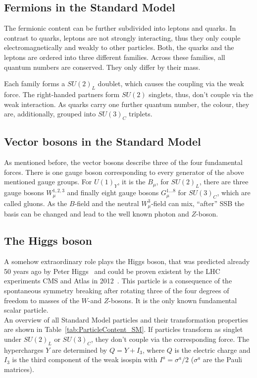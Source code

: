 \subsection*{Fermions in the Standard Model}
The fermionic content can be further subdivided into leptons and quarks.
In contrast to quarks, leptons are not strongly interacting, thus they only couple electromagnetically and weakly to other particles.
Both, the quarks and the leptons are ordered into three different families.
Across these families, all quantum numbers are conserved.
They only differ by their mass.

Each family forms a $SU(2)_L$ doublet, which causes the coupling via the weak force.
The right-handed partners form $SU(2)$ singlets, thus, don't couple via the weak interaction.
As quarks carry one further quantum number, the colour, they are, additionally, grouped into $SU(3)_C$ triplets.

\subsection*{Vector bosons in the Standard Model}
As mentioned before, the vector bosons describe three of the four fundamental forces.
There is one gauge boson corresponding to every generator of the above mentioned gauge groups.
For $U(1)_Y$, it is the $B_{\mu}$, for $SU(2)_L$, there are three gauge bosons $W_{\mu}^{1,2,3}$ and finally eight gauge bosons $G_{\mu}^{1...8}$ for $SU(3)_C$, which are called gluons.
As the $B$-field and the neutral $W^3_{\mu}$-field can mix, ``after'' SSB the basis can be changed and lead to the well known photon and $Z$-boson.

\subsection*{The Higgs boson}
A somehow extraordinary role plays the Higgs boson, that was predicted already 50 years ago by Peter Higgs~\cite{bib:Higgs_Prediction,bib:Higgs_Prediction_2} and could be proven existent by the LHC experiments CMS and Atlas in 2012~\cite{bib:Theory:CMS:HiggsObservation,bib:Theory:Atlas:HiggsObservation}.
This particle is a consequence of the spontaneous symmetry breaking after rotating three of the four degrees of freedom to masses of the $W$-and $Z$-bosons.
It is the only known fundamental scalar particle.\\


An overview of all Standard Model particles and their transformation properties are shown in Table~\ref{tab:ParticleContent_SM}.
If particles transform as singlet under $SU(2)_L$ or $SU(3)_C$, they don't couple via the corresponding force.
The hypercharges $Y$ are determined by $Q=Y+I_3$, where $Q$ is the electric charge and $I_3$ is the third component of the weak isospin with $I^a = \sigma^a/2$ ($\sigma^a$ are the Pauli matrices). 

